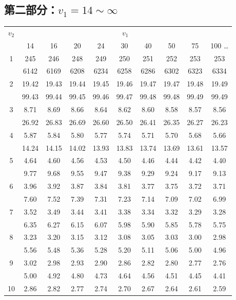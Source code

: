 \documentclass[lang=cn,10pt]{elegantbook}
\begin{document}
\subsection{第二部分：$v_1 = 14 \sim \infty$}
\begin{longtable}{c|ccccccccc}
    \hline
    $v_2$ & \multicolumn{9}{c}{$v_1$} \\
    & 14 & 16 & 20 & 24 & 30 & 40 & 50 & 75 & 100 \dots \\
    \hline
    \endhead
    1 & 245 & 246 & 248 & 249 & 250 & 251 & 252 & 253 & 253 \\
      & 6142 & 6169 & 6208 & 6234 & 6258 & 6286 & 6302 & 6323 & 6334 \\
    2 & 19.42 & 19.43 & 19.44 & 19.45 & 19.46 & 19.47 & 19.47 & 19.48 & 19.49 \\
      & 99.43 & 99.44 & 99.45 & 99.46 & 99.47 & 99.48 & 99.48 & 99.49 & 99.49 \\
    3 & 8.71 & 8.69 & 8.66 & 8.64 & 8.62 & 8.60 & 8.58 & 8.57 & 8.56 \\
      & 26.92 & 26.83 & 26.69 & 26.60 & 26.50 & 26.41 & 26.35 & 26.27 & 26.23 \\
    4 & 5.87 & 5.84 & 5.80 & 5.77 & 5.74 & 5.71 & 5.70 & 5.68 & 5.66 \\
      & 14.24 & 14.15 & 14.02 & 13.93 & 13.83 & 13.74 & 13.69 & 13.61 & 13.57 \\
    5 & 4.64 & 4.60 & 4.56 & 4.53 & 4.50 & 4.46 & 4.44 & 4.42 & 4.40 \\
      & 9.77 & 9.68 & 9.55 & 9.47 & 9.38 & 9.29 & 9.24 & 9.17 & 9.13 \\
    6 & 3.96 & 3.92 & 3.87 & 3.84 & 3.81 & 3.77 & 3.75 & 3.72 & 3.71 \\
      & 7.60 & 7.52 & 7.39 & 7.31 & 7.23 & 7.14 & 7.09 & 7.02 & 6.99 \\
    7 & 3.52 & 3.49 & 3.44 & 3.41 & 3.38 & 3.34 & 3.32 & 3.29 & 3.28 \\
      & 6.35 & 6.27 & 6.15 & 6.07 & 5.98 & 5.90 & 5.85 & 5.78 & 5.75 \\
    8 & 3.23 & 3.20 & 3.15 & 3.12 & 3.08 & 3.05 & 3.03 & 3.00 & 2.98 \\
      & 5.56 & 5.48 & 5.36 & 5.28 & 5.20 & 5.11 & 5.06 & 5.00 & 4.96 \\
    9 & 3.02 & 2.98 & 2.93 & 2.90 & 2.86 & 2.82 & 2.80 & 2.77 & 2.76 \\
      & 5.00 & 4.92 & 4.80 & 4.73 & 4.64 & 4.56 & 4.51 & 4.45 & 4.41 \\
    10& 2.86 & 2.82 & 2.77 & 2.74 & 2.70 & 2.67 & 2.64 & 2.61 & 2.59 \\

\end{longtable}
\end{document}
